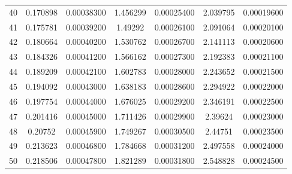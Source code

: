 \begin{table}[h]
{\begin{tabular}{ccccccc}
	40     & 0.170898 & 0.00038300 & 1.456299 & 0.00025400 & 2.039795 & 0.00019600 \\
	41     & 0.175781 & 0.00039200 & 1.49292  & 0.00026100 & 2.091064 & 0.00020100 \\
	42     & 0.180664 & 0.00040200 & 1.530762 & 0.00026700 & 2.141113 & 0.00020600 \\
	43     & 0.184326 & 0.00041200 & 1.566162 & 0.00027300 & 2.192383 & 0.00021100 \\
	44     & 0.189209 & 0.00042100 & 1.602783 & 0.00028000 & 2.243652 & 0.00021500 \\
	45     & 0.194092 & 0.00043000 & 1.638183 & 0.00028600 & 2.294922 & 0.00022000 \\
	46     & 0.197754 & 0.00044000 & 1.676025 & 0.00029200 & 2.346191 & 0.00022500 \\
	47     & 0.201416 & 0.00045000 & 1.711426 & 0.00029900 & 2.39624  & 0.00023000 \\
	48     & 0.20752  & 0.00045900 & 1.749267 & 0.00030500 & 2.44751  & 0.00023500 \\
	49     & 0.213623 & 0.00046800 & 1.784668 & 0.00031200 & 2.497558 & 0.00024000 \\
	50     & 0.218506 & 0.00047800 & 1.821289 & 0.00031800 & 2.548828 & 0.00024500 \\
\hline
  \end{tabular}
  }
  \end{table}

